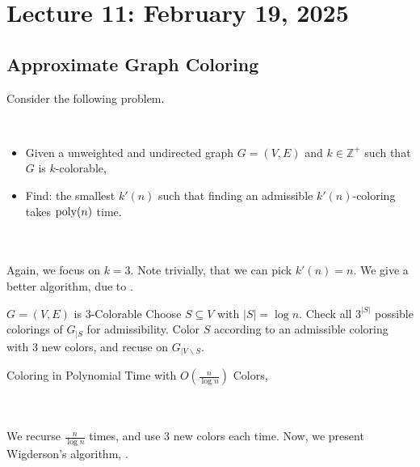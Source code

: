 \pagebreak

    \section{Lecture 11: February 19, 2025}

        \subsection{Approximate Graph Coloring}

        Consider the following problem.
        \begin{compprob} \label{prob:graphcolorrelax}
            \vphantom
            \\
            \begin{itemize}
                \item Given a unweighted and undirected graph \(G=(V,E)\) and \(k\in\mathbb{Z}^+\) such that \(G\) is \(k\)-colorable,
                \item Find: the smallest \(k'(n)\) such that finding an admissible \(k'(n)\)-coloring takes \(\operatorname{poly}(n)\) time.
            \end{itemize}
        \end{compprob}
        \vphantom
        \\
        \\
        Again, we focus on \(k=3\). Note trivially, that we can pick \(k'(n)=n\). We give a better algorithm, due to \cite{johnson1974worst}.
        \begin{algorithm}[H] 
            \begin{algorithmic}[1]
                \Require \(G=(V,E)\) is \(3\)-Colorable
                    \State Choose \(S\subseteq V\) with \(|S|=\log n\).
                    \State Check all \(3^{|S|}\) possible colorings of \(G_{|S}\) for admissibility.
                    \State Color \(S\) according to an admissible coloring with \(3\) new colors, and recuse on \(G_{|V\backslash S}\).
                \EndProcedure 
            \end{algorithmic}
            \caption{Coloring in Polynomial Time with \(O\left(\frac{n}{\log n}\right)\) Colors, \cite{johnson1974worst}}
            \label{alg:3color-relax}
        \end{algorithm}
        \vphantom
        \\
        \\
        We recurse \(\frac{n}{\log n}\) times, and use \(3\) new colors each time. Now, we present Wigderson's algorithm, \cite{wigderson1983improving}.
